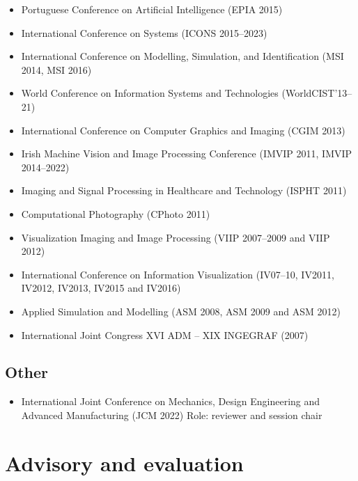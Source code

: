 \documentclass[11pt]{article}
\begin{document}
\begin{itemize}
  \item Portuguese Conference on Artificial Intelligence (EPIA 2015)
  \item International Conference on Systems (ICONS 2015--2023)
  \item International Conference on Modelling, Simulation, and Identification (MSI 2014, MSI 2016)
  \item World Conference on Information Systems and Technologies (WorldCIST'13--21)
  \item International Conference on Computer Graphics and Imaging (CGIM 2013)
  \item Irish Machine Vision and Image Processing Conference (IMVIP 2011, IMVIP 2014--2022)
  \item Imaging and Signal Processing in Healthcare and Technology (ISPHT 2011)
  \item Computational Photography (CPhoto 2011)
  \item Visualization Imaging and Image Processing (VIIP 2007--2009 and VIIP 2012) 
  \item International Conference on Information Visualization (IV07--10, IV2011, IV2012, IV2013, IV2015 and IV2016)
  \item Applied Simulation and Modelling (ASM 2008, ASM 2009 and ASM 2012)
  \item International Joint Congress XVI ADM -- XIX INGEGRAF (2007)
\end{itemize}

\subsection*{Other}
\begin{itemize}
	\item International Joint Conference on Mechanics, Design Engineering and Advanced Manufacturing (JCM 2022) \hfill Role: reviewer and session chair
\end{itemize} 

\section*{Advisory and evaluation}
\end{document}
